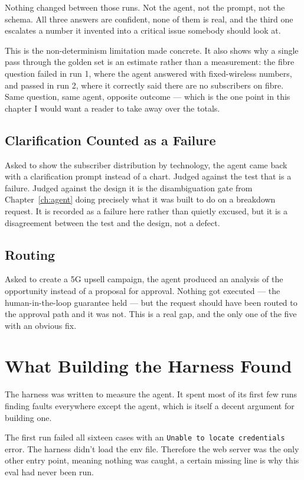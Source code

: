 Nothing changed between those runs. Not the agent, not the prompt, not the
schema. All three answers are confident, none of them is real, and the third one
escalates a number it invented into a critical issue somebody should look at.

This is the non-determinism limitation made concrete. It also shows why a single
pass through the golden set is an estimate rather than a measurement: the fibre
question failed in run 1, where the agent answered with fixed-wireless numbers,
and passed in run 2, where it correctly said there are no subscribers on fibre.
Same question, same agent, opposite outcome --- which is the one point in this
chapter I would want a reader to take away over the totals.

\subsection{Clarification Counted as a Failure}

Asked to show the subscriber distribution by technology, the agent came back
with a clarification prompt instead of a chart. Judged against the test that is
a failure. Judged against the design it is the disambiguation gate from
Chapter~\ref{ch:agent} doing precisely what it was built to do on a breakdown
request. It is recorded as a failure here rather than quietly excused, but it is
a disagreement between the test and the design, not a defect.

\subsection{Routing}

Asked to create a 5G upsell campaign, the agent produced an analysis of the
opportunity instead of a proposal for approval. Nothing got executed --- the
human-in-the-loop guarantee held --- but the request should have been routed to
the approval path and it was not. This is a real gap, and the only one of the
five with an obvious fix.

\section{What Building the Harness Found}

The harness was written to measure the agent. It spent most of its first few
runs finding faults everywhere except the agent, which is itself a decent
argument for building one.

The first run failed all sixteen cases with an \texttt{Unable to 
locate credentials} error. The harness didn't load the env file. Therefore the web server 
was the only other entry point, meaning nothing was caught, a 
certain missing line is why this eval had never been run. 

